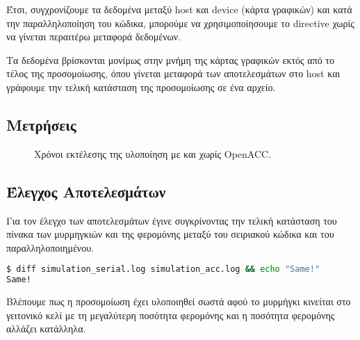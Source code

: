 \documentclass[11pt]{scrartcl} %
\begin{document}


Έτσι, συγχρονίζουμε τα δεδομένα μεταξύ host και device (κάρτα γραφικών) και κατά την παραλληλοποίηση του κώδικα, 
μπορούμε να χρησιμοποίησουμε το  directive χωρίς να γίνεται περαιτέρω μεταφορά δεδομένων. \cite{openaccbestpractices}

Τα δεδομένα βρίσκονται μονίμως στην μνήμη της κάρτας γραφικών εκτός από το τέλος της προσομοίωσης, όπου γίνεται μεταφορά των αποτελεσμάτων στο host
και γράφουμε την τελική κατάσταση της προσομοίωσης σε ένα αρχείο.

\subsection{Μετρήσεις}


\begin{figure}[H]
    \begin{center}
    \end{center}
    \caption{Χρόνοι εκτέλεσης της υλοποίηση με και χωρίς OpenACC.}
    \label{fig:acc_times}
\end{figure}


\subsection{Έλεγχος Αποτελεσμάτων}

Για τον έλεγχο των αποτελεσμάτων έγινε συγκρίνοντας 
την τελική κατάσταση του πίνακα των μυρμηγκιών και της φερομόνης 
μεταξύ του σειριακού κώδικα και του παραλληλοποιημένου.

\begin{lstlisting}[language=Bash]
$ diff simulation_serial.log simulation_acc.log && echo "Same!"
Same!
\end{lstlisting}



Βλέπουμε πως η προσομοίωση έχει υλοποιηθεί σωστά αφού το μυρμήγκι κινείται στο γειτονικό κελί με τη μεγαλύτερη ποσότητα φερομόνης 
και η ποσότητα φερομόνης αλλάζει κατάλληλα.


\end{document}
